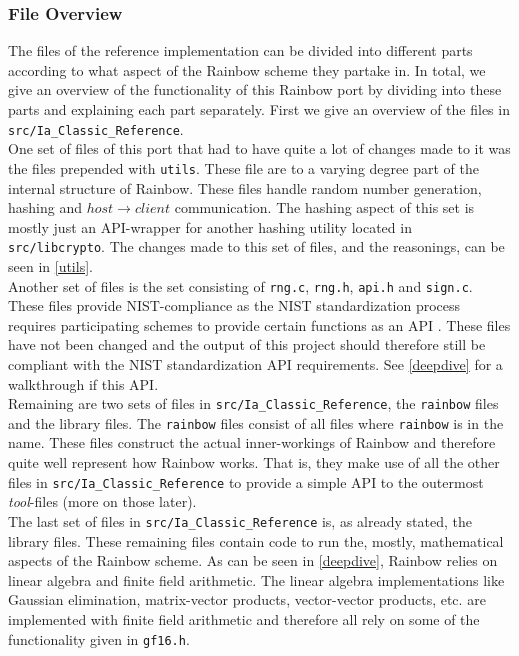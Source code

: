 \subsubsection{File Overview}
The files of the reference implementation can be divided into different parts according to what aspect of the Rainbow scheme they partake in. In total, we give an overview of the functionality of this Rainbow port by dividing into these parts and explaining each part separately. First we give an overview of the files in \texttt{src/Ia\_Classic\_Reference}.
\medskip\\
One set of files of this port that had to have quite a lot of changes made to it was the files prepended with \texttt{utils}. These file are to a varying degree part of the internal structure of Rainbow. These files handle random number generation, hashing and $host\rightarrow client$ communication. The hashing aspect of this set is mostly just an API-wrapper for another hashing utility located in \texttt{src/libcrypto}. The changes made to this set of files, and the reasonings, can be seen in \cref{utils}.
\medskip\\
Another set of files is the set consisting of \texttt{rng.c}, \texttt{rng.h}, \texttt{api.h} and \texttt{sign.c}. These files provide NIST-compliance as the NIST standardization process requires participating schemes to provide certain functions as an API \cite{nistapi}. These files have not been changed and the output of this project should therefore still be compliant with the NIST standardization API requirements. See \cref{deepdive} for a walkthrough if this API.
\medskip\\
Remaining are two sets of files in \texttt{src/Ia\_Classic\_Reference}, the \texttt{rainbow} files and the library files. The \texttt{rainbow} files consist of all files where \texttt{rainbow} is in the name. These files construct the actual inner-workings of Rainbow and therefore quite well represent how Rainbow works. That is, they make use of all the other files in \texttt{src/Ia\_Classic\_Reference} to provide a simple API to the outermost \emph{tool}-files (more on those later).
\medskip\\
The last set of files in \texttt{src/Ia\_Classic\_Reference} is, as already stated, the library files. These remaining files contain code to run the, mostly, mathematical aspects of the Rainbow scheme. As can be seen in \cref{deepdive}, Rainbow relies on linear algebra and finite field arithmetic. The linear algebra implementations like Gaussian elimination, matrix-vector products, vector-vector products, etc. are implemented with finite field arithmetic and therefore all rely on some of the functionality given in \texttt{gf16.h}.
